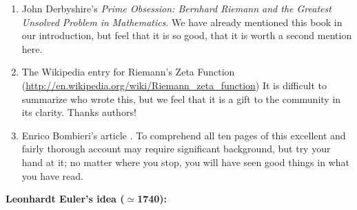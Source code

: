 \documentclass[openany]{book}
\theoremstyle{plain}
\theoremstyle{definition}
\begin{document}
{{{ \begin{enumerate}
 \item John Derbyshire's {\it Prime Obsession: Bernhard Riemann and
     the Greatest Unsolved Problem in Mathematics}.  We have already
   mentioned this book in our introduction, but feel that it is so
   good, that it is worth a second mention here.
 \item The Wikipedia entry for Riemann's Zeta Function
   (\url{http://en.wikipedia.org/wiki/Riemann\_zeta\_function}) It is
   difficult to summarize who wrote this, but we feel that it is a
   gift to the community in its clarity. Thanks authors!
 \item Enrico Bombieri's article .
   To comprehend all ten pages of this excellent and fairly thorough
   account may require significant background, but try your hand at
   it; no matter where you stop, you will have seen good things in
   what you have read.
\end{enumerate}
\vskip20pt
{\bf Leonhardt Euler's idea ($\simeq$1740):}

}}}
\end{document}
